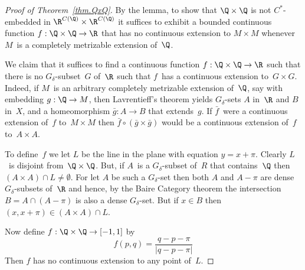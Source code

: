 \documentclass[a4paper]{amsart}
\theoremstyle{plain}
\theoremstyle{definition}
\theoremstyle{remark}
\begin{document}
\begin{proof}[Proof of Theorem~\ref{thm.QxQ}]
By the lemma, to show that $\Q\times\Q$ is not $C^*$-embedded in
$\R^{C(\Q)}\times\R^{C(\Q)}$ it suffices to exhibit a bounded continuous function
$f:\Q\times\Q\to\R$ that has no continuous extension to $M\times M$
whenever $M$~is a completely metrizable extension of~$\Q$.

We claim that it suffices to find a continuous function $f:\Q\times\Q\to\R$
such that there is no $G_\delta$-subset~$G$ of~$\R$ such that $f$~has
a continuous extension to~$G\times G$.
Indeed, if $M$~is an arbitrary completely metrizable extension of~$\Q$,
say with embedding $g:\Q\to M$, then Lavrentieff's theorem yields $G_\delta$-sets
$A$ in~$\R$ and $B$ in~$X$, and a homeomorphism $\bar g:A\to B$ that 
extends~$g$. 
If $\bar f$~were a continuous extension of~$f$ to~$M\times M$ then
$\bar f\circ (\bar g\times\bar g)$ would be a continuous extension of~$f$
to~$A\times A$.

To define~$f$ we let $L$ be the line in the plane with equation $y=x+\pi$.
Clearly $L$~is disjoint from~$\Q\times\Q$.
But, if $A$~is a $G_\delta$-subset of~$R$ that contains~$\Q$ 
then $(A\times A)\cap L\neq\emptyset$.
For let $A$ be such a $G_\delta$-set then both $A$ and $A-\pi$ are dense
$G_\delta$-subsets of~$\R$ and hence, by the Baire Category theorem
the intersection $B=A\cap(A-\pi)$ is also a dense $G_\delta$-set.
But if $x\in B$ then $(x,x+\pi)\in (A\times A)\cap L$.

Now define $f:\Q\times\Q\to[-1,1]$ by
$$
f(p,q)=\frac{q-p-\pi}{|q-p-\pi|}  %
$$
Then $f$ has no continuous extension to any point of~$L$.
\end{proof}
\end{document}
